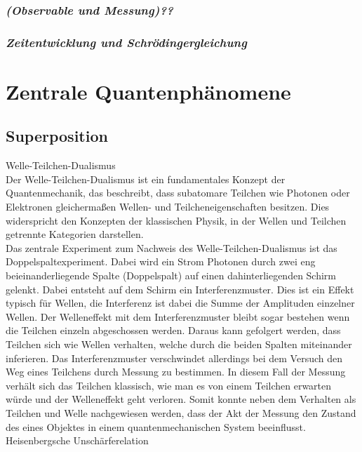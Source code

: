 \subsubsection{\textit{(Observable und Messung)??}} 
\subsubsection{\textit{Zeitentwicklung und Schrödingergleichung} }

\section{Zentrale Quantenphänomene }
\subsection{Superposition }

Welle-Teilchen-Dualismus \\

Der Welle-Teilchen-Dualismus ist ein fundamentales Konzept der Quantenmechanik, das beschreibt, dass subatomare Teilchen wie Photonen oder Elektronen gleichermaßen Wellen- und Teilcheneigenschaften besitzen. Dies widerspricht den Konzepten der klassischen Physik, in der Wellen und Teilchen getrennte Kategorien darstellen. \\

Das zentrale Experiment zum Nachweis des Welle-Teilchen-Dualismus ist das Doppelspaltexperiment. Dabei wird ein Strom Photonen durch zwei eng beieinanderliegende Spalte (Doppelspalt) auf einen dahinterliegenden Schirm gelenkt. Dabei entsteht auf dem Schirm ein Interferenzmuster. Dies ist ein Effekt typisch für  Wellen, die Interferenz ist dabei die Summe der Amplituden einzelner Wellen. Der Welleneffekt mit dem Interferenzmuster bleibt sogar bestehen wenn die Teilchen einzeln abgeschossen werden. Daraus kann gefolgert werden, dass Teilchen sich wie Wellen verhalten, welche durch die beiden Spalten miteinander inferieren. Das Interferenzmuster verschwindet allerdings bei dem Versuch den Weg eines Teilchens durch Messung zu bestimmen. In diesem Fall der Messung verhält sich das Teilchen klassisch, wie man es von einem Teilchen erwarten würde und der Welleneffekt geht verloren. Somit konnte neben dem Verhalten als Teilchen und Welle nachgewiesen werden, dass der Akt der Messung den Zustand des eines Objektes in einem quantenmechanischen System beeinflusst. \\

Heisenbergsche Unschärferelation \\

